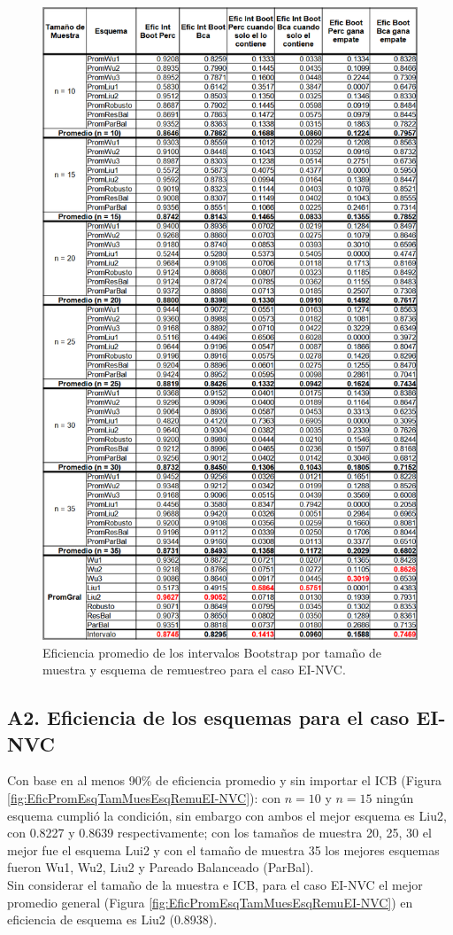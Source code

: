 \begin{figure}[ht] 
	\centering 
	\includegraphics[width=0.55\linewidth]{img/EI_NVC_Efic_Boots.png} 
	\caption{Eficiencia promedio de los intervalos Bootstrap por tamaño de muestra y esquema de remuestreo para el caso EI-NVC.} 
	\label{fig:EficPromIntBootsTamMuestEsqRemuEI-NVC}
\end{figure}
\FloatBarrier



\subsection*{A2. Eficiencia de los esquemas para el caso EI-NVC}


Con base en al menos 90\% de eficiencia promedio y sin importar el ICB (Figura \ref{fig:EficPromEsqTamMuesEsqRemuEI-NVC}): con $n=10$ y $n=15$ ningún esquema cumplió la condición, sin embargo con ambos el mejor esquema es Liu2, con 0.8227 y 0.8639 respectivamente; con los tamaños de muestra 20, 25, 30 el mejor fue el esquema Lui2 y con el tamaño de muestra 35 los mejores esquemas fueron Wu1, Wu2, Liu2 y Pareado Balanceado (ParBal).\\

Sin considerar el tamaño de la muestra e ICB, para el caso EI-NVC el mejor promedio general (Figura \ref{fig:EficPromEsqTamMuesEsqRemuEI-NVC}) en eficiencia de esquema es Liu2 (0.8938).


